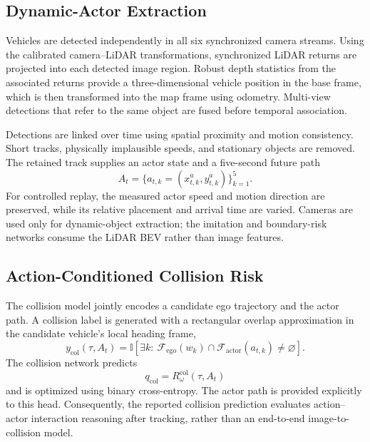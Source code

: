 \subsection{Dynamic-Actor Extraction}
\label{sec:dynamic_actor_method}

Vehicles are detected independently in all six synchronized camera streams. Using the calibrated camera--LiDAR transformations, synchronized LiDAR returns are projected into each detected image region. Robust depth statistics from the associated returns provide a three-dimensional vehicle position in the base frame, which is then transformed into the map frame using odometry. Multi-view detections that refer to the same object are fused before temporal association.

Detections are linked over time using spatial proximity and motion consistency. Short tracks, physically implausible speeds, and stationary objects are removed. The retained track supplies an actor state and a five-second future path
\begin{equation}
A_t=\{a_{t,k}=(x^a_{t,k},y^a_{t,k})\}_{k=1}^{5}.
\end{equation}
For controlled replay, the measured actor speed and motion direction are preserved, while its relative placement and arrival time are varied. Cameras are used only for dynamic-object extraction; the imitation and boundary-risk networks consume the LiDAR BEV rather than image features.

\subsection{Action-Conditioned Collision Risk}

The collision model jointly encodes a candidate ego trajectory and the actor path. A collision label is generated with a rectangular overlap approximation in the candidate vehicle's local heading frame,
\begin{equation}
y_{\mathrm{col}}(\tau,A_t)=
\mathbb{I}\!\left[\exists k:\
\mathcal{F}_{\mathrm{ego}}(w_k)\cap
\mathcal{F}_{\mathrm{actor}}(a_{t,k})\neq\varnothing\right].
\label{eq:collision_target}
\end{equation}
The collision network predicts
\begin{equation}
q_{\mathrm{col}}=R_{\omega}^{\mathrm{col}}(\tau,A_t)
\end{equation}
and is optimized using binary cross-entropy. The actor path is provided explicitly to this head. Consequently, the reported collision prediction evaluates action--actor interaction reasoning after tracking, rather than an end-to-end image-to-collision model.


